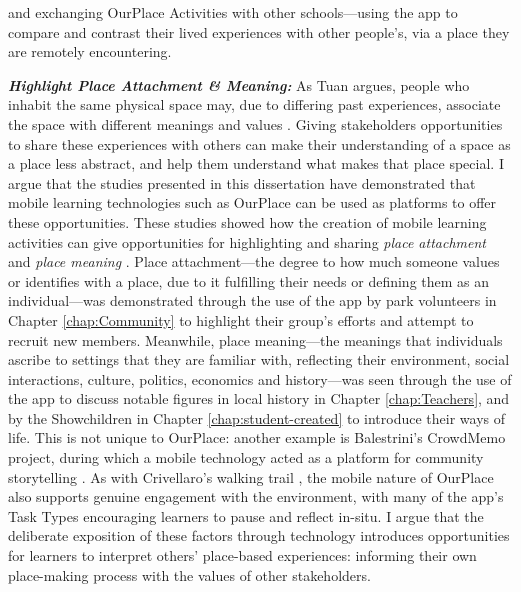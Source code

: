 and exchanging OurPlace Activities with other schools---using the app to compare and contrast their lived experiences with other people's, via a place they are remotely encountering. 

\textbf{\textit{Highlight Place Attachment \& Meaning:}}  As Tuan argues, people who inhabit the same physical space may, due to differing past experiences, associate the space with different meanings and values \citep{Tuan1978}. Giving stakeholders opportunities to share these experiences with others can make their understanding of a space as a place less abstract, and help them understand what makes that place special. I argue that the studies presented in this dissertation have demonstrated that mobile learning technologies such as OurPlace can be used as platforms to offer these opportunities. These studies showed how the creation of mobile learning activities can give opportunities for highlighting and sharing \textit{place attachment} and \textit{place meaning} \citep{Kudryavtsev2012}. Place attachment---the degree to how much someone values or identifies with a place, due to it fulfilling their needs or defining them as an individual---was demonstrated through the use of the app by park volunteers in Chapter \ref{chap:Community} to highlight their group's efforts and attempt to recruit new members. Meanwhile, place meaning---the meanings that individuals ascribe to settings that they are familiar with, reflecting their environment, social interactions, culture, politics, economics and history---was seen through the use of the app to discuss notable figures in local history in Chapter \ref{chap:Teachers}, and by the Showchildren in Chapter \ref{chap:student-created} to introduce their ways of life. This is not unique to OurPlace: another example is Balestrini's CrowdMemo project, during which a mobile technology acted as a platform for community storytelling \citep{Balestrini2014}. As with Crivellaro's walking trail \citep{Crivellaro2016}, the mobile nature of OurPlace also supports genuine engagement with the environment, with many of the app's Task Types encouraging learners to pause and reflect in-situ. I argue that the deliberate exposition of these factors through technology introduces opportunities for learners to interpret others' place-based experiences: informing their own place-making process with the values of other stakeholders.

